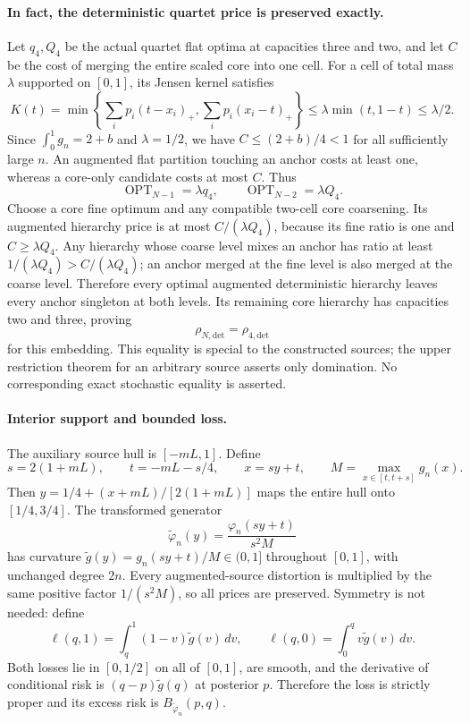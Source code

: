\paragraph{In fact, the deterministic quartet price is preserved exactly.}
Let $q_4,Q_4$ be the actual quartet flat optima at capacities three and
two, and let $C$ be the cost of merging the entire scaled core into
one cell. For a cell of total mass $\lambda$ supported on $[0,1]$,
its Jensen kernel satisfies
\[
 K(t)=\min\!\left\{\sum_i p_i(t-x_i)_+,
                       \sum_i p_i(x_i-t)_+\right\}
 \le\lambda\min(t,1-t)\le\lambda/2.
\]
Since $\int_0^1g_n=2+b$ and $\lambda=1/2$, we have
$C\le(2+b)/4<1$ for all sufficiently large $n$.
An augmented flat partition touching an anchor costs at least one,
whereas a core-only candidate costs at most $C$. Thus
\[
 \operatorname{OPT}_{N-1}=\lambda q_4,\qquad
 \operatorname{OPT}_{N-2}=\lambda Q_4.
\]
Choose a core fine optimum and any compatible two-cell core coarsening.
Its augmented hierarchy price is at most $C/(\lambda Q_4)$, because
its fine ratio is one and $C\ge\lambda Q_4$. Any hierarchy whose
coarse level mixes an anchor has ratio at least
$1/(\lambda Q_4)>C/(\lambda Q_4)$; an anchor merged at the fine level
is also merged at the coarse level. Therefore every optimal augmented
deterministic hierarchy leaves every anchor singleton at both levels.
Its remaining core hierarchy has capacities two and three, proving
\[
 \rho_{N,\mathrm{det}}=\rho_{4,\mathrm{det}}
\]
for this embedding. This equality is special to the constructed sources;
the upper restriction theorem for an arbitrary source asserts only
domination. No corresponding exact stochastic equality is asserted.

\paragraph{Interior support and bounded loss.}
The auxiliary source hull is $[-mL,1]$. Define
\[
 s=2(1+mL),\qquad t=-mL-s/4,
 \qquad x=sy+t,
 \qquad M=\max_{x\in[t,t+s]}g_n(x).
\]
Then $y=1/4+(x+mL)/[2(1+mL)]$ maps the entire hull onto
$[1/4,3/4]$. The transformed generator
\[
 \widetilde\varphi_n(y)=\frac{\varphi_n(sy+t)}{s^2M}
\]
has curvature $\widetilde g(y)=g_n(sy+t)/M\in(0,1]$ throughout
$[0,1]$, with unchanged degree $2n$. Every augmented-source distortion
is multiplied by the same positive factor $1/(s^2M)$, so all prices
are preserved. Symmetry is not needed: define
\[
 \ell(q,1)=\int_q^1(1-v)\widetilde g(v)\,dv,
 \qquad
 \ell(q,0)=\int_0^q v\widetilde g(v)\,dv.
\]
Both losses lie in $[0,1/2]$ on all of $[0,1]$, are smooth, and the
derivative of conditional risk is $(q-p)\widetilde g(q)$ at posterior
$p$. Therefore the loss is strictly proper and its excess risk is
$B_{\widetilde\varphi_n}(p,q)$.

